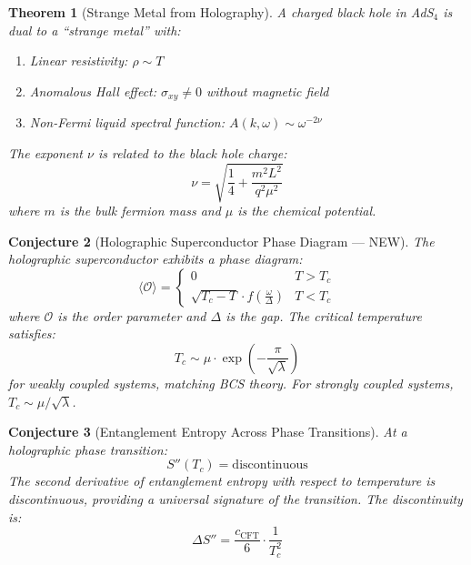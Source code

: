 \documentclass[12pt,a4paper]{article}
\newtheorem{theorem}{Theorem}[section]
\newtheorem{conjecture}[theorem]{Conjecture}
\begin{document}
\begin{theorem}[Strange Metal from Holography]
A charged black hole in AdS$_4$ is dual to a ``strange metal'' with:
\begin{enumerate}
    \item Linear resistivity: $\rho \sim T$
    \item Anomalous Hall effect: $\sigma_{xy} \neq 0$ without magnetic field
    \item Non-Fermi liquid spectral function: $A(k, \omega) \sim \omega^{-2\nu}$
\end{enumerate}
The exponent $\nu$ is related to the black hole charge:
\begin{equation}
\nu = \sqrt{\frac{1}{4} + \frac{m^2 L^2}{q^2 \mu^2}}
\end{equation}
where $m$ is the bulk fermion mass and $\mu$ is the chemical potential.
\end{theorem}

\begin{conjecture}[Holographic Superconductor Phase Diagram --- NEW]
The holographic superconductor exhibits a phase diagram:
\begin{equation}
\langle \mathcal{O} \rangle = \begin{cases}
0 & T > T_c \\
\sqrt{T_c - T} \cdot f\left( \frac{\omega}{\Delta} \right) & T < T_c
\end{cases}
\end{equation}
where $\mathcal{O}$ is the order parameter and $\Delta$ is the gap. The critical temperature satisfies:
\begin{equation}
T_c \sim \mu \cdot \exp\left( -\frac{\pi}{\sqrt{\lambda}} \right)
\end{equation}
for weakly coupled systems, matching BCS theory. For strongly coupled systems, $T_c \sim \mu/\sqrt{\lambda}$.
\end{conjecture}

\begin{conjecture}[Entanglement Entropy Across Phase Transitions]
At a holographic phase transition:
\begin{equation}
S''(T_c) = \text{discontinuous}
\end{equation}
The second derivative of entanglement entropy with respect to temperature is discontinuous, providing a universal signature of the transition. The discontinuity is:
\begin{equation}
\Delta S'' = \frac{c_{\text{CFT}}}{6} \cdot \frac{1}{T_c^2}
\end{equation}
\end{conjecture}
\end{document}
